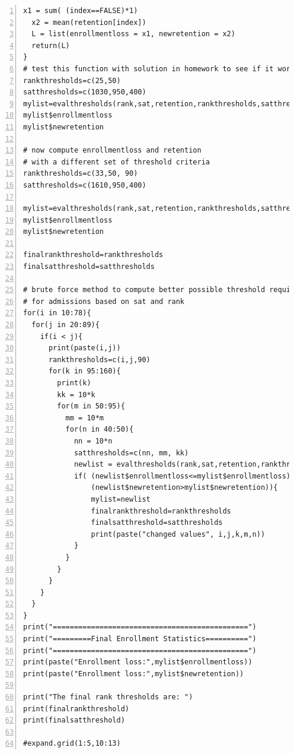 \documentclass{article}
\begin{document}
\begin{Verbatim}[numbers = left]
  x1 = sum( (index==FALSE)*1)
  x2 = mean(retention[index])
  L = list(enrollmentloss = x1, newretention = x2)
  return(L)
}
# test this function with solution in homework to see if it works.
rankthresholds=c(25,50)
satthresholds=c(1030,950,400)
mylist=evalthresholds(rank,sat,retention,rankthresholds,satthresholds)
mylist$enrollmentloss
mylist$newretention

# now compute enrollmentloss and retention 
# with a different set of threshold criteria
rankthresholds=c(33,50, 90)
satthresholds=c(1610,950,400)

mylist=evalthresholds(rank,sat,retention,rankthresholds,satthresholds)
mylist$enrollmentloss
mylist$newretention

finalrankthreshold=rankthresholds
finalsatthreshold=satthresholds

# brute force method to compute better possible threshold requirements
# for admissions based on sat and rank
for(i in 10:78){
  for(j in 20:89){
    if(i < j){
      print(paste(i,j))
      rankthresholds=c(i,j,90)
      for(k in 95:160){
        print(k)
        kk = 10*k
        for(m in 50:95){
          mm = 10*m
          for(n in 40:50){
            nn = 10*n
            satthresholds=c(nn, mm, kk)
            newlist = evalthresholds(rank,sat,retention,rankthresholds,satthresholds)
            if( (newlist$enrollmentloss<=mylist$enrollmentloss) & 
                (newlist$newretention>mylist$newretention)){
                mylist=newlist
                finalrankthreshold=rankthresholds
                finalsatthreshold=satthresholds
                print(paste("changed values", i,j,k,m,n))
            }
          }
        }
      }
    }
  }
}
print("==============================================")
print("=========Final Enrollment Statistics==========")
print("==============================================")
print(paste("Enrollment loss:",mylist$enrollmentloss))
print(paste("Enrollment loss:",mylist$newretention))

print("The final rank thresholds are: ")
print(finalrankthreshold)
print(finalsatthreshold)

#expand.grid(1:5,10:13)
\end{Verbatim}
\end{document}
